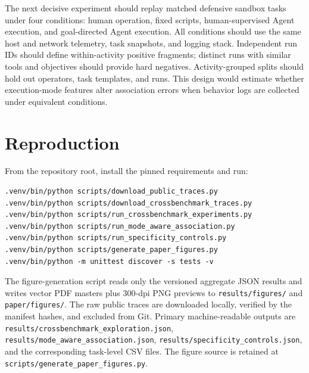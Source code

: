 The next decisive experiment should replay matched defensive sandbox tasks under four conditions: human operation, fixed scripts, human-supervised Agent execution, and goal-directed Agent execution. All conditions should use the same host and network telemetry, task snapshots, and logging stack. Independent run IDs should define within-activity positive fragments; distinct runs with similar tools and objectives should provide hard negatives. Activity-grouped splits should hold out operators, task templates, and runs. This design would estimate whether execution-mode features alter association errors when behavior logs are collected under equivalent conditions.

\section{Reproduction}
\label{app:reproduction}

From the repository root, install the pinned requirements and run:
\begin{verbatim}
.venv/bin/python scripts/download_public_traces.py
.venv/bin/python scripts/download_crossbenchmark_traces.py
.venv/bin/python scripts/run_crossbenchmark_experiments.py
.venv/bin/python scripts/run_mode_aware_association.py
.venv/bin/python scripts/run_specificity_controls.py
.venv/bin/python scripts/generate_paper_figures.py
.venv/bin/python -m unittest discover -s tests -v
\end{verbatim}

The figure-generation script reads only the versioned aggregate JSON results and writes vector PDF masters plus 300-dpi PNG previews to \texttt{results/figures/} and \texttt{paper/figures/}. The raw public traces are downloaded locally, verified by the manifest hashes, and excluded from Git. Primary machine-readable outputs are \texttt{results/crossbenchmark\_exploration.json}, \texttt{results/mode\_aware\_association.json}, \texttt{results/specificity\_controls.json}, and the corresponding task-level CSV files. The figure source is retained at \texttt{scripts/generate\_paper\_figures.py}.
